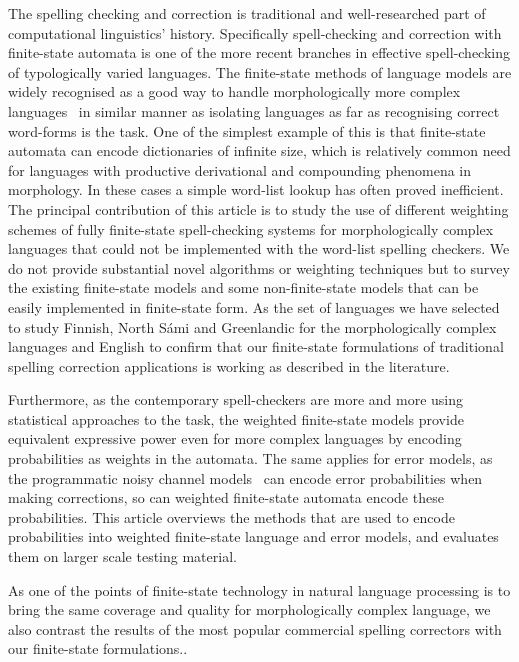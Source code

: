 \documentclass[a4paper,12pt]{article}
\begin{document}
The spelling checking and correction is traditional and well-researched part of
computational linguistics' history. Specifically spell-checking and correction
with finite-state automata is one of the more recent branches in effective
spell-checking of typologically varied languages. The finite-state methods of
language models are widely recognised as a good way to handle morphologically
more complex languages~\cite[]{beesley2003finite} in similar manner as isolating
languages as far as recognising correct word-forms is the task. One of the
simplest example of this is that finite-state automata can encode dictionaries
of infinite size, which is relatively common need for languages with productive
derivational and compounding phenomena in morphology.  In these cases a simple
word-list lookup has often proved inefficient. The principal contribution
of this article is to study the use of different weighting schemes of 
fully finite-state spell-checking systems for morphologically complex languages
that could not be implemented with the word-list spelling checkers. We do not
provide substantial novel algorithms or weighting techniques but to survey the
existing finite-state models and some non-finite-state models that can be
easily implemented in finite-state form. As the set of languages we have
selected to study Finnish, North Sámi and Greenlandic for the morphologically
complex languages and English to confirm that our finite-state formulations of
traditional spelling correction applications is working as described in the
literature.

Furthermore, as the contemporary spell-checkers are more and more using
statistical approaches to the task, the weighted finite-state models provide
equivalent expressive power even for more complex languages by encoding
probabilities as weights in the automata.  The same applies for error models,
as the programmatic noisy channel models~\cite[]{brill2000improved} can encode
error probabilities when making corrections, so can weighted finite-state
automata encode these probabilities. This article overviews the methods that
are used to encode probabilities into weighted finite-state language and error
models, and evaluates them on larger scale testing material.

As one of the
points of finite-state technology in natural language processing is to bring
the same coverage and quality for morphologically complex language, we also
contrast the results of the most popular commercial spelling correctors with
our finite-state formulations..
\end{document}
